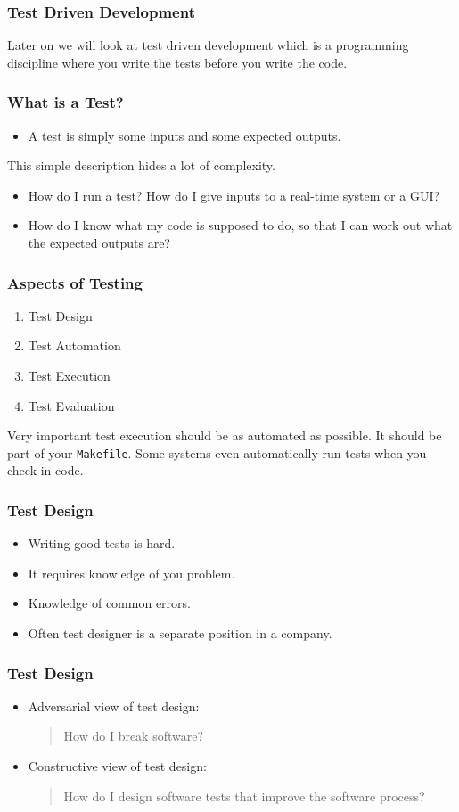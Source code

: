 \documentclass{beamer}
\begin{document}
\begin{frame}
  \frametitle{Test Driven Development}
  Later on we will look at test driven development which is a
  programming discipline where you write the tests before you write
  the code.
\end{frame}
\begin{frame}
  \frametitle{What is a Test?}

  \begin{itemize}
  \item A test is simply some inputs and some expected outputs.
  \end{itemize}
  This simple description hides a lot of complexity.
  \begin{itemize}
  \item How do I run a test? How do I give inputs to a real-time system or a
    GUI?
  \item How do I know what my code is supposed to do, so that I can work out
    what the expected outputs are?
  \end{itemize}
\end{frame}
\begin{frame}
  \frametitle{Aspects of Testing}
  \begin{enumerate}
  \item Test Design
  \item Test Automation
  \item Test Execution
  \item Test Evaluation
  \end{enumerate}
Very important test execution should be as automated as possible. It
should be part of your {\tt Makefile}. Some systems even automatically
run tests when you check in code.
\end{frame}
\begin{frame}
  \frametitle{Test Design}
  \begin{itemize}
  \item   Writing good tests is  hard. 
  \item It requires knowledge of you  problem.
  \item Knowledge of common errors.
  \item Often test designer is a separate  position in a company.
  \end{itemize}
\end{frame}
\begin{frame}
  \frametitle{Test Design}
  
  \begin{itemize}
  \item Adversarial view of test design: 
    \begin{quote}
       How do I break software? \pause
    \end{quote}
  \item Constructive view of test design:
    \begin{quote}
       How do I design software tests that improve the software process?
    \end{quote}
  \end{itemize}
\end{frame}
\end{document}
